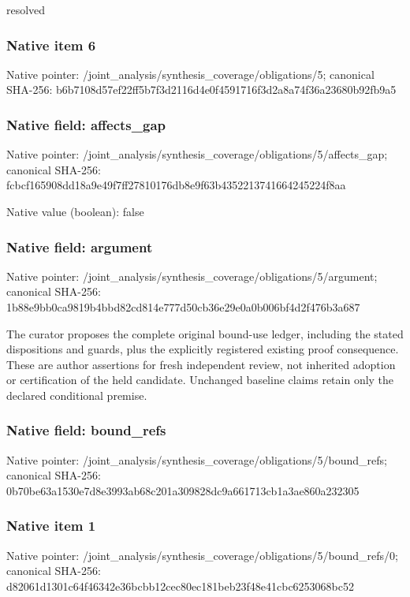 \documentclass[10pt,a4paper]{article}
\begin{document}
\begingroup\raggedright\sloppy resolved\par\endgroup

\subsubsection{Native item 6}
Native pointer: /joint\_\allowbreak{}analysis/synthesis\_\allowbreak{}coverage/obligations/5; canonical SHA-256: b6b7108d57ef22ff5b7f3d2116d4e0f4591716f3d2a8a74f36a23680b92fb9a5

\subsubsection{Native field: affects\_\allowbreak{}gap}
Native pointer: /joint\_\allowbreak{}analysis/synthesis\_\allowbreak{}coverage/obligations/5/affects\_\allowbreak{}gap; canonical SHA-256: fcbcf165908dd18a9e49f7ff27810176db8e9f63b4352213741664245224f8aa

Native value (boolean): false

\subsubsection{Native field: argument}
Native pointer: /joint\_\allowbreak{}analysis/synthesis\_\allowbreak{}coverage/obligations/5/argument; canonical SHA-256: 1b88e9bb0ca9819b4bbd82cd814e777d50cb36e29e0a0b006bf4d2f476b3a687

\begingroup\raggedright\sloppy The curator proposes the complete original bound-use ledger,\allowbreak{} including the stated dispositions and guards,\allowbreak{} plus the explicitly registered existing proof consequence. These are author assertions for fresh independent review,\allowbreak{} not inherited adoption or certification of the held candidate. Unchanged baseline claims retain only the declared conditional premise.\par\endgroup

\subsubsection{Native field: bound\_\allowbreak{}refs}
Native pointer: /joint\_\allowbreak{}analysis/synthesis\_\allowbreak{}coverage/obligations/5/bound\_\allowbreak{}refs; canonical SHA-256: 0b70be63a1530e7d8e3993ab68c201a309828dc9a661713cb1a3ae860a232305

\subsubsection{Native item 1}
Native pointer: /joint\_\allowbreak{}analysis/synthesis\_\allowbreak{}coverage/obligations/5/bound\_\allowbreak{}refs/0; canonical SHA-256: d82061d1301c64f46342e36bcbb12cec80ec181beb23f48e41cbc6253068bc52
\end{document}
